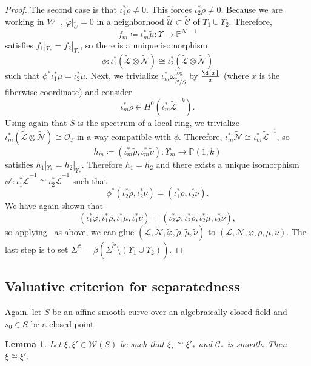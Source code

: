 \documentclass{amsart}
\newtheorem{lem}[thm]{Lemma}
\theoremstyle{definition}
\theoremstyle{remark}
\theoremstyle{plain}
\theoremstyle{definition}
\theoremstyle{remark}
\renewcommand{\P}{\mathbb{P}}
\newcommand{\mc}[1]{\mathcal{#1}}
\newcommand{\wt}[1]{\widetilde{#1}}
\newcommand{\1}{\mathbf{1}}
\newcommand{\2}{\mathbf{2}}
\newcommand{\3}{\mathbf{3}}
\begin{document}
\begin{proof}
    The second case is that $\iota_1^* \wt{\rho} \neq 0$. This forces $\iota_2^* \wt{\rho} \neq 0$. Because we are working in $\mc{W}^-$, $\wt{\varphi}|_{\wt{U}} = 0$ in a neighborhood $\wt{\mc{U}} \subset \wt{\mc{C}}$ of $\Upsilon_1 \cup \Upsilon_2$. Therefore,
    \[ f_m \coloneqq \iota_m^* \wt{\mu} \colon \Upsilon \to \P^{N-1} \]
    satisfies $f_1|_{\Upsilon_*} = f_2|_{\Upsilon_*}$, so there is a unique isomorphism 
    \[\phi \colon \iota_1^* ( \wt{\mc{L}} \otimes \wt{\mc{N}} ) \cong \iota_2^* ( \wt{\mc{L}} \otimes \wt{\mc{N}} ) \]
    such that $\phi^* \iota_1^* \wt{\mu} = \iota_2^* \wt{\mu}$. Next, we trivialize $\iota_m^* \omega_{\wt{\mc{C}}/S}^{\log}$ by $\frac{\d{x}}{x}$ (where $x$ is the fiberwise coordinate) and consider
    \[ \iota_m^* \wt{\rho} \in H^0(\iota_m^* \wt{\mc{L}}^{-k}). \]
    Using again that $S$ is the spectrum of a local ring, we trivialize $\iota_m^* (\wt{\mc{L}} \otimes \wt{\mc{N}}) \cong \mc{O}_{\Upsilon}$ in a way compatible with $\phi$. Therefore, $\iota_m^* \wt{\mc{N}} \cong \iota_m^* \wt{\mc{L}}^{-1}$, so
    \[ h_m \coloneqq (\iota_m^* \wt{\rho}, \iota_m^* \wt{\nu}) \colon \Upsilon_m \to \P(1,k) \]
    satisfies $h_1 |_{\Upsilon_*} = h_2|_{\Upsilon_*}$. Therefore $h_1 = h_2$ and there exists a unique isomorphism $\phi' \colon \iota_1^* \wt{\mc{L}}^{-1} \cong \iota_2^* \wt{\mc{L}}^{-1}$ such that
    \[ \phi^* (\iota_2^* \wt{\rho}, \iota_2^* \wt{\nu}) = (\iota_1^* \wt{\rho}, \iota_2^* \wt{\nu}). \]
    We have again shown that
    \[ (\iota_1^* \wt{\varphi},\iota_1^* \wt{\rho}, \iota_1^* \wt{\mu}, \iota_1^* \wt{\nu}) = (\iota_2^* \wt{\varphi},\iota_2^* \wt{\rho}, \iota_2^* \wt{\mu}, \iota_2^* \wt{\nu}), \]
    so applying~\cite[Corollary 3.22]{mspfermat} as above, we can glue $(\wt{\mc{L}},\wt{\mc{N}},\wt{\varphi},\wt{\rho},\wt{\mu},\wt{\nu})$ to $(\mc{L},\mc{N},\varphi,\rho,\mu,\nu)$. The last step is to set $\Sigma^{\mc{C}} = \beta(\Sigma^{\wt{\mc{C}}} \setminus ( \Upsilon_1 \cup \Upsilon_2 ))$.
\end{proof}

\subsection{Valuative criterion for separatedness}

Again, let $S$ be an affine smooth curve over an algebraically closed field and $s_0 \in S$ be a closed point.

\begin{lem}\label{lem:smuniqueness}
    Let $\xi, \xi' \in \mc{W}(S)$ be such that $\xi_* \cong \xi'_*$ and $\mc{C}_*$ is smooth. Then $\xi \cong \xi'$.
\end{lem}
\end{document}

